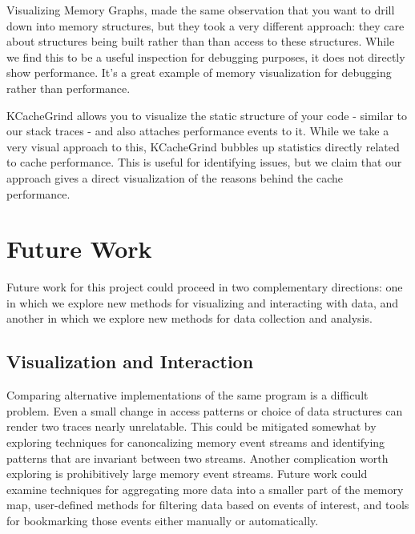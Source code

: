 \documentclass[annual]{acmsiggraph}
\begin{document}
Visualizing Memory Graphs\cite{zimmerman:2001:VMG}, made the same observation that you want to drill down into memory structures, but they took a very different approach: they care about structures being built rather than than access to these structures. While we find this to be a useful inspection for debugging purposes, it does not directly show performance. It's a great example of memory visualization for debugging rather than performance.

KCacheGrind allows you to visualize the static structure of your code - similar to our stack traces - and also attaches performance events to it. While we take a very visual approach to this, KCacheGrind bubbles up statistics directly related to cache performance. This is useful for identifying issues, but we claim that our approach gives a direct visualization of the reasons behind the cache performance.

\section{Future Work}\label{ch_f}

  Future work for this project could proceed in two complementary directions:
    one in which we explore new methods for visualizing and interacting with data,
    and another in which we explore new methods for data collection and analysis.

  \subsection{Visualization and Interaction}

  Comparing alternative implementations of the same program is a difficult problem.
  Even a small change in access patterns or choice of data structures can render two traces nearly unrelatable.
  This could be mitigated somewhat by exploring techniques for canoncalizing memory event streams and identifying patterns
    that are invariant between two streams.
  Another complication worth exploring is prohibitively large memory event streams.  
  Future work could examine techniques for aggregating more data into a smaller part of the memory map,
    user-defined methods for filtering data based on events of interest,
    and tools for bookmarking those events either manually or automatically.
\end{document}
